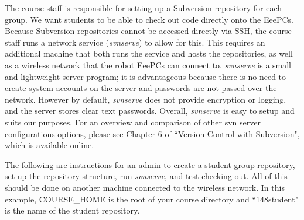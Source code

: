 The course staff is responsible for setting up a Subversion repository for each group. We want students to be able to check out code directly onto the EeePCs. Because Subversion repositories cannot be accessed directly via SSH, the course staff runs a network service (\textit{svnserve}) to allow for this. This requires an additional machine that both runs the service and hosts the repositories, as well as a wireless network that the robot EeePCs can connect to. \textit{svnserve} is a small and lightweight server program; it is advantageous because there is no need to create system accounts on the server and passwords are not passed over the network. However by default, \textit{svnserve} does not provide encryption or logging, and the server stores clear text passwords. Overall, \textit{svnserve} is easy to setup and suits our purposes. For an overview and comparison of other svn server configurations options, please see Chapter 6 of \href{http://svnbook.red-bean.com/en/1.5/index.html}{``Version Control with Subversion"}, which is available online.

The following are instructions for an admin to create a student group repository, set up the repository structure, run \textit{svnserve}, and test checking out. All of this should be done on another machine connected to the wireless network. In this example, COURSE\_HOME is the root of your course directory and ``148student" is the name of the student repository.

